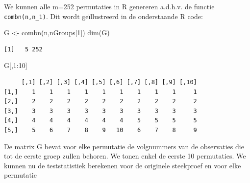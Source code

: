 \documentclass[
  dutch,
  letterpaper,
  12pt]{book}
\newenvironment{Shaded}{\begin{snugshade}}{\end{snugshade}}
\newcommand{\CommentTok}[1]{\textcolor[rgb]{0.37,0.37,0.37}{#1}}
\newcommand{\DecValTok}[1]{\textcolor[rgb]{0.68,0.00,0.00}{#1}}
\newcommand{\FunctionTok}[1]{\textcolor[rgb]{0.28,0.35,0.67}{#1}}
\newcommand{\NormalTok}[1]{\textcolor[rgb]{0.00,0.23,0.31}{#1}}
\newcommand{\OtherTok}[1]{\textcolor[rgb]{0.00,0.23,0.31}{#1}}
\newcommand{\SpecialCharTok}[1]{\textcolor[rgb]{0.37,0.37,0.37}{#1}}
\theoremstyle{definition}
\theoremstyle{definition}
\theoremstyle{definition}
\theoremstyle{remark}
\begin{document}
We kunnen alle m=252 permutaties in R genereren a.d.h.v. de functie
\texttt{combn(n,n\_1)}. Dit wordt geïllustreerd in de onderstaande R
code:

\begin{Shaded}
\begin{Highlighting}[]
\NormalTok{G }\OtherTok{\textless{}{-}} \FunctionTok{combn}\NormalTok{(n,nGroups[}\DecValTok{1}\NormalTok{])}
\FunctionTok{dim}\NormalTok{(G)}
\end{Highlighting}
\end{Shaded}

\begin{verbatim}
[1]   5 252
\end{verbatim}

\begin{Shaded}
\begin{Highlighting}[]
\NormalTok{G[,}\DecValTok{1}\SpecialCharTok{:}\DecValTok{10}\NormalTok{]}
\end{Highlighting}
\end{Shaded}

\begin{verbatim}
     [,1] [,2] [,3] [,4] [,5] [,6] [,7] [,8] [,9] [,10]
[1,]    1    1    1    1    1    1    1    1    1     1
[2,]    2    2    2    2    2    2    2    2    2     2
[3,]    3    3    3    3    3    3    3    3    3     3
[4,]    4    4    4    4    4    4    5    5    5     5
[5,]    5    6    7    8    9   10    6    7    8     9
\end{verbatim}

De matrix G bevat voor elke permutatie de volgnummers van de observaties
die tot de eerste groep zullen behoren. We tonen enkel de eerste 10
permutaties. We kunnen nu de teststatistiek berekenen voor de originele
steekproef en voor elke permutatie

\begin{Shaded}
\end{Shaded}
\end{document}
